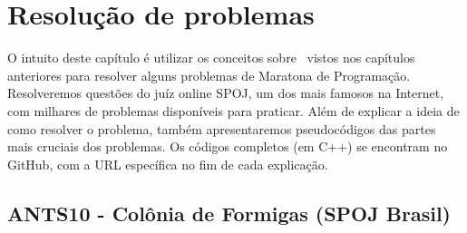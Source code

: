 \chapter{Resolução de problemas}
\label{cap:resolucao-problemas}

O intuito deste capítulo é utilizar os conceitos sobre \LCA\ vistos nos capítulos anteriores para resolver alguns problemas de Maratona de Programação. Resolveremos questões do juíz online SPOJ, um dos mais famosos na Internet, com milhares de problemas disponíveis para praticar. Além de explicar a ideia de como resolver o problema, também apresentaremos pseudocódigos das partes mais cruciais dos problemas. Os códigos completos (em C++) se encontram no GitHub, com a URL específica no fim de cada explicação.

\section{ANTS10 - Colônia de Formigas  (SPOJ Brasil)}

